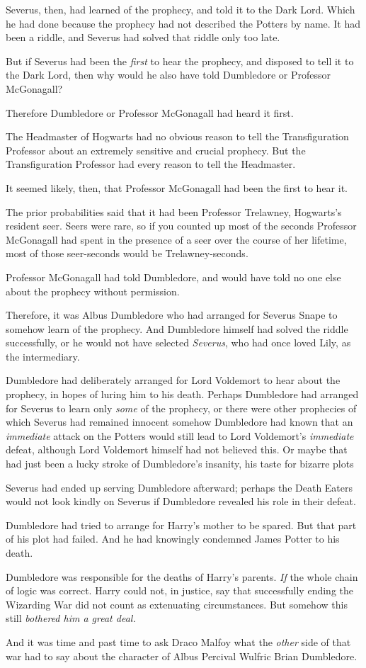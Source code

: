Severus, then, had learned of the prophecy, and told it to the Dark Lord. Which
he had done because the prophecy had not described the Potters by name. It had
been a riddle, and Severus had solved that riddle only too late.

But if Severus had been the \emph{first} to hear the prophecy, and disposed to
tell it to the Dark Lord, then why would he also have told Dumbledore or
Professor McGonagall?

Therefore Dumbledore or Professor McGonagall had heard it first.

The Headmaster of Hogwarts had no obvious reason to tell the Transfiguration
Professor about an extremely sensitive and crucial prophecy. But the
Transfiguration Professor had every reason to tell the Headmaster.

It seemed likely, then, that Professor McGonagall had been the first to hear it.

The prior probabilities said that it had been Professor Trelawney, Hogwarts's
resident seer. Seers were rare, so if you counted up most of the seconds
Professor McGonagall had spent in the presence of a seer over the course of her
lifetime, most of those seer-seconds would be Trelawney-seconds.

Professor McGonagall had told Dumbledore, and would have told no one else about
the prophecy without permission.

Therefore, it was Albus Dumbledore who had arranged for Severus Snape to
somehow learn of the prophecy. And Dumbledore himself had solved the riddle
successfully, or he would not have selected \emph{Severus}, who had once loved
Lily, as the intermediary.

Dumbledore had deliberately arranged for Lord Voldemort to hear about the
prophecy, in hopes of luring him to his death. Perhaps Dumbledore had arranged
for Severus to learn only \emph{some} of the prophecy, or there were other
prophecies of which Severus had remained innocent{\el} somehow Dumbledore
had known that an \emph{immediate} attack on the Potters would still lead to
Lord Voldemort's \emph{immediate} defeat, although Lord Voldemort himself had
not believed this. Or maybe that had just been a lucky stroke of Dumbledore's
insanity, his taste for bizarre plots{\el}

Severus had ended up serving Dumbledore afterward; perhaps the Death Eaters
would not look kindly on Severus if Dumbledore revealed his role in their
defeat.

Dumbledore had tried to arrange for Harry's mother to be spared. But that part
of his plot had failed. And he had knowingly condemned James Potter to his
death.

Dumbledore was responsible for the deaths of Harry's parents. \emph{If} the
whole chain of logic was correct. Harry could not, in justice, say that
successfully ending the Wizarding War did not count as extenuating
circumstances. But somehow this still{\el} \emph{bothered him a great deal.}

And it was time and past time to ask Draco Malfoy what the \emph{other} side of
that war had to say about the character of Albus Percival Wulfric Brian
Dumbledore.
